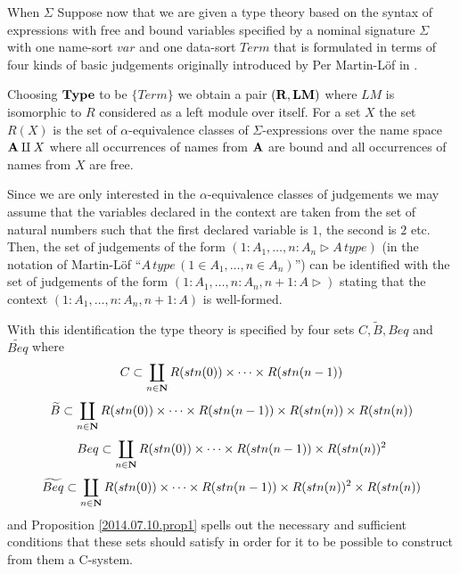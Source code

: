 \documentclass[11pt]{article}
\newcommand{\nn}{{\bf N\rm}}
\newcommand{\nat}{\nn}
\newcommand{\rr}{{\bf R}}
\newcommand{\lm}{{\bf LM}}
\newcommand{\wt}{\widetilde}
\begin{document}
{{When $\Sigma$ Suppose now that we are given a type theory based on the syntax of expressions with free and bound variables specified by a nominal signature $\Sigma$ with one name-sort $var$ and one data-sort $Term$ that is formulated in terms of four kinds of basic judgements originally introduced by Per Martin-L\"{o}f in \cite[p.161]{MLTT79}.  

Choosing $\bf Type$ to be $\{Term\}$ we obtain a pair $(\rr,\lm)$ where $LM$ is isomorphic to $R$ considered as a left module over itself. For a set $X$ the set $R(X)$ is the set of $\alpha$-equivalence classes of $\Sigma$-expressions over the name space ${\bf A}\amalg X$ where all occurrences of names from $\bf A$ are bound and all occurrences of names from $X$ are free.  

Since we are only interested in the $\alpha$-equivalence classes of judgements we may assume that the variables declared in the context are taken from the set of natural numbers such that the first declared variable is $1$, the second is $2$ etc.  Then, the set of judgements of the form $(1:A_1,\dots,n:A_n\rhd A\, type)$ (in the notation of Martin-L\"{o}f ``$A\,type\,(1\in A_1,\dots,n\in A_n)$'') can be identified with the set of judgements of the form $(1:A_1,\dots,n:A_n, n+1:A\rhd)$ stating that the context $(1:A_1,\dots,n:A_n, n+1:A)$ is well-formed. 

With this identification the type theory is specified by four sets $C,\wt{B},Beq$ and $\wt{Beq}$ where 
%
$$C \subset \coprod_{n\in\nat} R({stn(0)})\times\dots\times R({stn(n-1)})$$
$$\wt{B}\subset  \coprod_{n\in\nat} R({stn(0)})\times\dots\times R({stn(n-1)})\times R({stn(n)})\times R({stn(n)})$$
$$Beq \subset \coprod_{n\in\nat} R({stn(0)})\times\dots\times R({stn(n-1)})\times R({stn(n)})^2$$
$$\wt{Beq} \subset \coprod_{n\in\nat} R({stn(0)})\times\dots\times R({stn(n-1)})\times R({stn(n)})^2\times R({stn(n)})$$ 
%
and Proposition \ref{2014.07.10.prop1} spells out the necessary and sufficient conditions that these sets should satisfy in order for it to be possible to construct from them a C-system. 





}}
\end{document}
